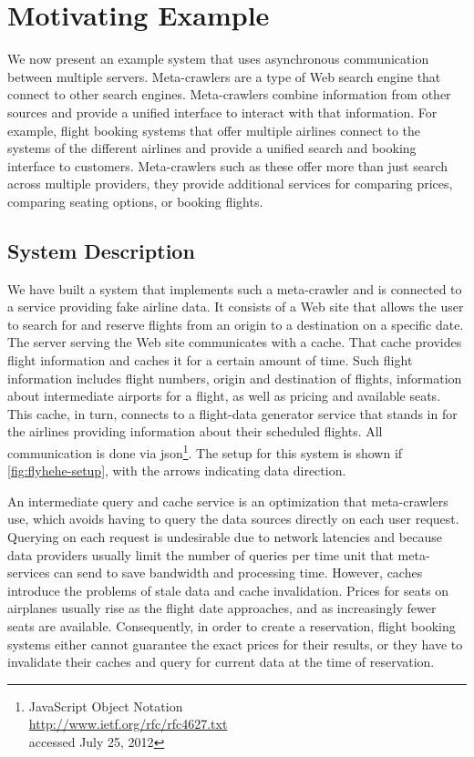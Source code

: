 \section{Motivating Example}
\label{sec:motivating-example}

We now present an example system that uses asynchronous communication
between multiple servers. Meta-crawlers are a type of Web search
engine that connect to other search engines. Meta-crawlers combine
information from other sources and provide a unified interface to
interact with that information. For example, flight booking systems
that offer multiple airlines connect to the systems of the different
airlines and provide a unified search and booking interface to
customers. Meta-crawlers such as these offer more than just search
across multiple providers, they provide additional services for
comparing prices, comparing seating options, or booking flights.

\subsection{System Description}
\label{sec:system-description}

We have built a system that implements such a meta-crawler and is
connected to a service providing fake airline data. It consists of a
Web site that allows the user to search for and reserve flights from
an origin to a destination on a specific date. The server serving the
Web site communicates with a cache. That cache provides flight
information and caches it for a certain amount of time. Such flight
information includes flight numbers, origin and destination of
flights, information about intermediate airports for a flight, as well
as pricing and available seats. This cache, in turn, connects to a
flight-data generator service that stands in for the airlines
providing information about their scheduled flights. All communication
is done via \ac{json}\footnote{JavaScript Object Notation\\
\url{http://www.ietf.org/rfc/rfc4627.txt}\\ accessed July 25,
2012}. The setup for this system is shown if
\autoref{fig:flyhehe-setup}, with the arrows indicating data
direction.

An intermediate query and cache service is an optimization that
meta-crawlers use, which avoids having to query the data sources
directly on each user request. Querying on each request is undesirable
due to network latencies and because data providers usually limit the
number of queries per time unit that meta-services can send to save
bandwidth and processing time. However, caches introduce the problems
of stale data and cache invalidation. Prices for seats on airplanes
usually rise as the flight date approaches, and as increasingly fewer
seats are available. Consequently, in order to create a reservation,
flight booking systems either cannot guarantee the exact prices for
their results, or they have to invalidate their caches and query for
current data at the time of reservation.

